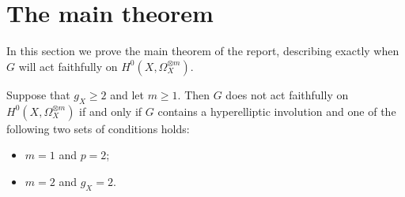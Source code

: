 \section{The main theorem}\label{maintheoremsection}
In this section we prove the main theorem of the report, describing exactly when $G$ will act faithfully on $H^0(X,\Omega_X^{\otimes m})$.


    \begin{unnumthm}
    Suppose that $g_X\geq 2$ and let $m\geq1$. 
    Then $G$ does not act faithfully on $H^0(X,\Omega_X^{\otimes m})$ if and only if $G$ contains a hyperelliptic involution and one of the following two sets of conditions holds:
        \begin{itemize}
        \item $m=1$ and $p=2$;
        \item $m=2$ and $g_X=2$.
        \end{itemize}
    \end{unnumthm}
